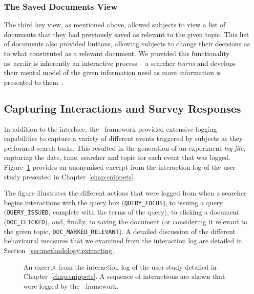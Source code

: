 \subsubsection{The Saved Documents View}\label{sec:methodology:user:interface:saved}
The third key view, as mentioned above, allowed subjects to view a list of documents that they had previously saved as relevant to the given topic. This list of documents also provided buttons, allowing subjects to change their decisions as to what constituted as a relevant document. We provided this functionality as~\gls{acr:iir} is inherently an interactive process -- a searcher \emph{learns} and develops their mental model of the given information need as more information is presented to them~\citep{ingwersen2005theturn}.

\subsection{Capturing Interactions and Survey Responses}\label{sec:methodology:user:capturing}
In addition to the interface, the \treconomics~framework provided extensive logging capabilities to capture a variety of different events triggered by subjects as they performed search tasks. This resulted in the generation of an experiment \emph{log file,} capturing the date, time, searcher and topic for each event that was logged. Figure~\ref{fig:log} provides an anonymised excerpt from the interaction log of the user study presented in Chapter~\ref{chap:snippets}.

The figure illustrates the different actions that were logged from when a searcher begins interactions with the query box (\texttt{QUERY\_FOCUS}), to issuing a query (\texttt{QUERY\_ISSUED}, complete with the terms of the query), to clicking a document (\texttt{DOC\_CLICKED}), and, finally, to saving the document (or considering it relevant to the given topic, \texttt{DOC\_MARKED\_RELEVANT}). A detailed discussion of the different behavioural measures that we examined from the interaction log are detailed in Section~\ref{sec:methodology:extracting}.

\begin{figure}[t!]
    \centering
    \caption[Experiment log file excerpt]{An excerpt from the interaction log of the user study detailed in Chapter~\ref{chap:snippets}. A sequence of interactions are shown that were logged by the \treconomics~framework.}
    \label{fig:log}
\end{figure}

